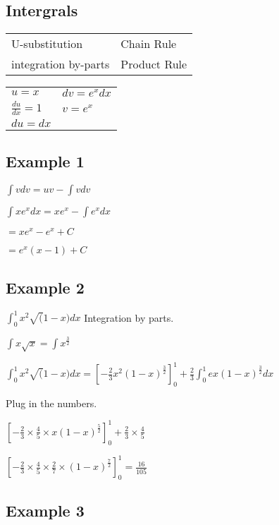 \documentclass[12pt,a4paper]{article}
\begin{document}
\newpage

\subsection*{Intergrals}
\begin{tabular}{l l}
    U-substitution       &  Chain Rule \\
    integration by-parts &  Product Rule \\
\end{tabular}
\newline

\begin{tabular}{l l}
    $u = x$             & $dv = e^x dx$ \\
    $\frac{du}{dx} = 1$ & $v = e^x$     \\
    $du = dx$           &               \\
\end{tabular}
\newline

\subsection*{Example 1}

\noindent $\int v dv = uv - \int v dv $

\noindent $\boxed{\int x e^x dx} = x e^x - \int e^x dx$

\noindent $=  xe^x - e^x + C$

\noindent $= e^x (x - 1) + C$

\subsection*{Example 2}

$\int_{0}^{1} x^2 \sqrt(1 - x) dx$ Integration by parts.

\noindent $\int x \sqrt{x} = \int x^\frac{3}{2}$

\noindent $\int_{0}^{1} x^2 \sqrt(1 - x) dx = [-\frac{2}{3}x^2 (1-x)^\frac{3}{2}]_{0}^{1} + \boxed{\frac{2}{3} \int_{0}^{1}ex(1-x)^\frac{3}{2} dx}$

\noindent Plug in the numbers.

\noindent $[-\frac{2}{3} \times \frac{4}{5} \times x(1-x)^\frac{5}{2}]_{0}^{1} + \frac{2}{3} \times \frac{4}{5}$

\noindent $[-\frac{2}{3} \times \frac{4}{5} \times \frac{2}{7} \times (1-x)^\frac{7}{2}]_{0}^{1} = \frac{16}{105}$

\subsection*{Example 3}
\end{document}
